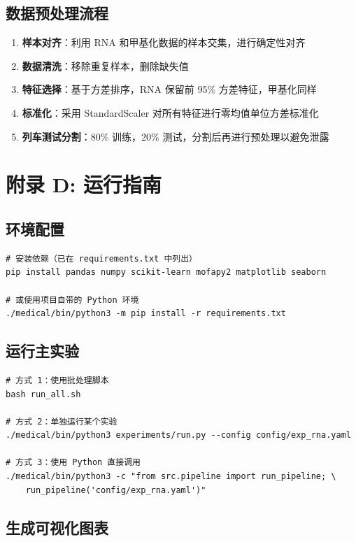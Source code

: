\subsection*{数据预处理流程}

\begin{enumerate}
    \item \textbf{样本对齐}：利用 RNA 和甲基化数据的样本交集，进行确定性对齐
    \item \textbf{数据清洗}：移除重复样本，删除缺失值
    \item \textbf{特征选择}：基于方差排序，RNA 保留前 95\% 方差特征，甲基化同样
    \item \textbf{标准化}：采用 StandardScaler 对所有特征进行零均值单位方差标准化
    \item \textbf{列车测试分割}：80\% 训练，20\% 测试，分割后再进行预处理以避免泄露
\end{enumerate}

\section*{附录 D: 运行指南}

\subsection*{环境配置}

\begin{verbatim}
# 安装依赖（已在 requirements.txt 中列出）
pip install pandas numpy scikit-learn mofapy2 matplotlib seaborn

# 或使用项目自带的 Python 环境
./medical/bin/python3 -m pip install -r requirements.txt
\end{verbatim}

\subsection*{运行主实验}

\begin{verbatim}
# 方式 1：使用批处理脚本
bash run_all.sh

# 方式 2：单独运行某个实验
./medical/bin/python3 experiments/run.py --config config/exp_rna.yaml

# 方式 3：使用 Python 直接调用
./medical/bin/python3 -c "from src.pipeline import run_pipeline; \
    run_pipeline('config/exp_rna.yaml')"
\end{verbatim}

\subsection*{生成可视化图表}


